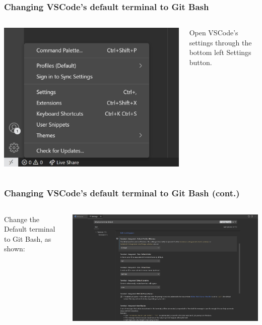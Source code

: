 \documentclass{beamer}
\begin{document}
  \begin{frame}
    \frametitle{Changing VSCode's default terminal to Git Bash}
    \begin{columns}[onlytextwidth]
      \begin{column}{0.6\textwidth}
        \centering
        \includegraphics[scale=0.4]{settings_bottom_toolbar}
      \end{column}
      \begin{column}{0.4\textwidth}
        Open VSCode's settings through the bottom left Settings button.
      \end{column}
    \end{columns}
  \end{frame}
  \begin{frame}
    \frametitle{Changing VSCode's default terminal to Git Bash (cont.)}
    \begin{columns}[onlytextwidth]
      \begin{column}{0.4\textwidth}
        Change the Default terminal to Git Bash, as shown:
      \end{column}
      \begin{column}{0.6\textwidth}
        \centering
        \includegraphics[scale=0.18]{default_terminal}
      \end{column}
    \end{columns}
  \end{frame}
\end{document}

